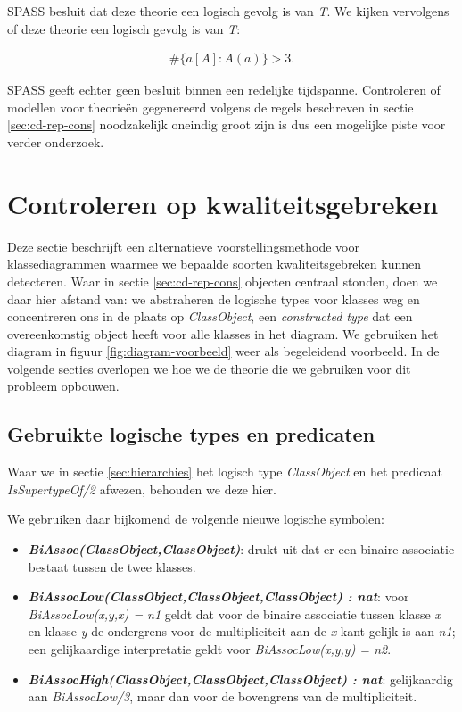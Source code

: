 SPASS besluit dat deze theorie een logisch gevolg is van \textit{T}. We kijken vervolgens of deze theorie een logisch gevolg is van \textit{T}:

\begin{align*}
\#\{a [A] : A(a)\} > 3.
\end{align*}

SPASS geeft echter geen besluit binnen een redelijke tijdspanne. Controleren of modellen voor theorie\"en gegenereerd volgens de regels beschreven in sectie \ref{sec:cd-rep-cons} noodzakelijk oneindig groot zijn is dus een mogelijke piste voor verder onderzoek.

\section{Controleren op kwaliteitsgebreken}\label{sec:kwaliteitsgebrek}
Deze sectie beschrijft een alternatieve voorstellingsmethode voor klassediagrammen waarmee we bepaalde soorten kwaliteitsgebreken kunnen detecteren. Waar in sectie \ref{sec:cd-rep-cons} objecten centraal stonden, doen we daar hier afstand van: we abstraheren de logische types voor klasses weg en concentreren ons in de plaats op \textit{ClassObject}, een \textit{constructed type} dat een overeenkomstig object heeft voor alle klasses in het diagram. We gebruiken het diagram in figuur \ref{fig:diagram-voorbeeld} weer als begeleidend voorbeeld. In de volgende secties overlopen we hoe we de theorie die we gebruiken voor dit probleem opbouwen.

\subsection{Gebruikte logische types en predicaten}
\sloppy Waar we in sectie \ref{sec:hierarchies} het logisch type \textit{ClassObject} en het predicaat \textit{IsSupertypeOf/2} afwezen, behouden we deze hier.

We gebruiken daar bijkomend de volgende nieuwe logische symbolen:

\begin{itemize}
	\item \textbf{\textit{BiAssoc(ClassObject,ClassObject)}}: drukt uit dat er een binaire associatie bestaat tussen de twee klasses.
	\item \sloppy \textbf{\textit{BiAssocLow(ClassObject,ClassObject,ClassObject) : nat}}: voor \\ \textit{BiAssocLow(x,y,x) = n1} geldt dat voor de binaire associatie tussen klasse \textit{x} en klasse \textit{y} de ondergrens voor de multipliciteit aan de \textit{x}-kant gelijk is aan \textit{n1}; een gelijkaardige interpretatie geldt voor \textit{BiAssocLow(x,y,y) = n2}.
	\item \textbf{\textit{BiAssocHigh(ClassObject,ClassObject,ClassObject) : nat}}: gelijkaardig aan \textit{BiAssocLow/3}, maar dan voor de bovengrens van de multipliciteit.
\end{itemize}

